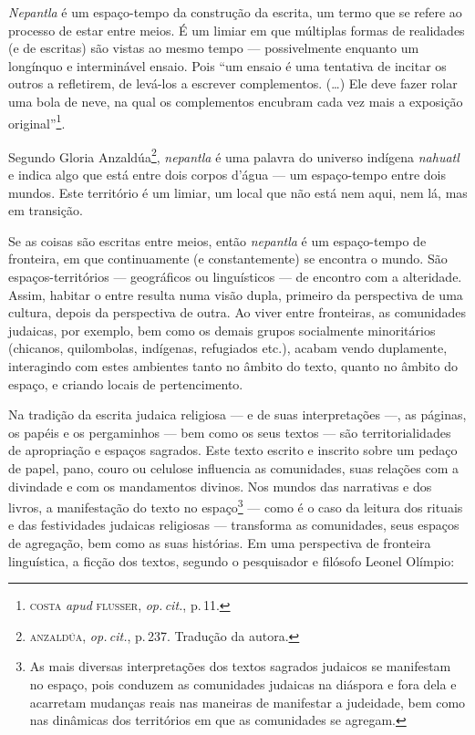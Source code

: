 \emph{Nepantla} é um espaço-tempo da construção da escrita, um termo que
se refere ao processo de estar entre meios. É um limiar em que múltiplas
formas de realidades (e de escritas) são vistas ao mesmo tempo ---
possivelmente enquanto um longínquo e interminável ensaio. Pois
``um ensaio é uma tentativa de incitar os outros a refletirem, de
levá-los a escrever complementos. (\ldots{}) Ele deve fazer rolar uma bola de
neve, na qual os complementos encubram cada vez mais a exposição
original''\footnote{\textsc{costa} \emph{apud} \textsc{flusser}, \emph{op.\,cit.}, p.\,11.}.

Segundo Gloria Anzaldúa\footnote{\textsc{anzaldúa}, \emph{op.\,cit.}, p.\,237. Tradução da autora.}, \emph{nepantla} é uma palavra do universo indígena
\emph{nahuatl} e indica algo que está entre dois corpos d'água --- um
espaço-tempo entre dois mundos. Este território é um limiar, um local
que não está nem aqui, nem lá, mas em transição.

Se as coisas são escritas entre meios, então \emph{nepantla} é um
espaço-tempo de fronteira, em que continuamente (e constantemente) se
encontra o mundo. São espaços-territórios --- geográficos ou
linguísticos --- de encontro com a alteridade. Assim, habitar o entre
resulta numa visão dupla, primeiro da perspectiva de uma cultura, depois
da perspectiva de outra. Ao viver entre fronteiras, as comunidades
judaicas, por exemplo, bem como os demais grupos socialmente
minoritários (chicanos, quilombolas, indígenas, refugiados etc.), acabam
vendo duplamente, interagindo com estes ambientes tanto no âmbito do
texto, quanto no âmbito do espaço, e criando locais de pertencimento.

\begin{center}\end{center}

\noindent{}Na tradição da escrita judaica religiosa --- e de suas interpretações
---, as páginas, os papéis e os pergaminhos --- bem como os seus textos
--- são territorialidades de apropriação e espaços sagrados. Este texto
escrito e inscrito sobre um pedaço de papel, pano, couro ou celulose
influencia as comunidades, suas relações com a divindade e com os
mandamentos divinos. Nos mundos das narrativas e dos livros, a
manifestação do texto no espaço\footnote{As mais diversas interpretações
  dos textos sagrados judaicos se manifestam no espaço, pois conduzem as
  comunidades judaicas na diáspora e fora dela e acarretam mudanças
  reais nas maneiras de manifestar a judeidade, bem como nas dinâmicas
  dos territórios em que as comunidades se agregam.} --- como é o caso
da leitura dos rituais e das festividades judaicas religiosas ---
transforma as comunidades, seus espaços de agregação, bem como as suas
histórias. Em uma perspectiva de fronteira linguística, a ficção dos
textos, segundo o pesquisador e filósofo Leonel Olímpio:


